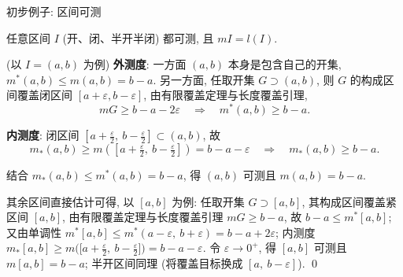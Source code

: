 \begin{frame}{初步例子: 区间可测}

\begin{prop}[区间可测]
任意区间 $I$ (开、闭、半开半闭) 都可测, 且 $m I = l(I)$.
\end{prop}

\pause

\startproof[bg=yellow, fg=red](以 $I = (a,b)$ 为例)
\textbf{外测度}: 一方面 $(a,b)$ 本身是包含自己的开集, $m^* (a,b) \leqslant m(a,b) = b - a$. 另一方面, 任取开集 $G \supset (a,b)$, 则 $G$ 的构成区间覆盖闭区间 $[a + \varepsilon, b - \varepsilon]$, 由有限覆盖定理与长度覆盖引理,
\[
m G \geqslant b - a - 2\varepsilon
\quad \Longrightarrow \quad m^* (a,b) \geqslant b - a .
\]

\pause

\textbf{内测度}: 闭区间 $\left[a + \frac{\varepsilon}{2},\ b - \frac{\varepsilon}{2}\right] \subset (a,b)$, 故
\[
m_* (a,b) \geqslant m\left(\left[a + \tfrac{\varepsilon}{2},\ b - \tfrac{\varepsilon}{2}\right]\right) = b - a - \varepsilon
\quad \Longrightarrow \quad m_* (a,b) \geqslant b - a .
\]

\pause

结合 $m_* (a,b) \leqslant m^* (a,b) = b - a$, 得 $(a,b)$ 可测且 $m(a,b) = b - a$.

\pause

其余区间\alert{直接估计}可得, 以 $[a,b]$ 为例: 任取开集 $G \supset [a,b]$, 其构成区间覆盖紧区间 $[a,b]$, 由有限覆盖定理与长度覆盖引理 $m G \geqslant b - a$, 故 $b - a \leqslant m^* [a,b]$; 又由单调性 $m^* [a,b] \leqslant m^* (a - \varepsilon,\ b + \varepsilon) = b - a + 2\varepsilon$; 内测度 $m_* [a,b] \geqslant m\big( \big[a + \tfrac{\varepsilon}{2},\ b - \tfrac{\varepsilon}{2}\big] \big) = b - a - \varepsilon$. 令 $\varepsilon \to 0^+$, 得 $[a,b]$ 可测且 $m [a,b] = b - a$; 半开区间同理 (将覆盖目标换成 $[a,\ b - \varepsilon]$).
\qed

\end{frame}




